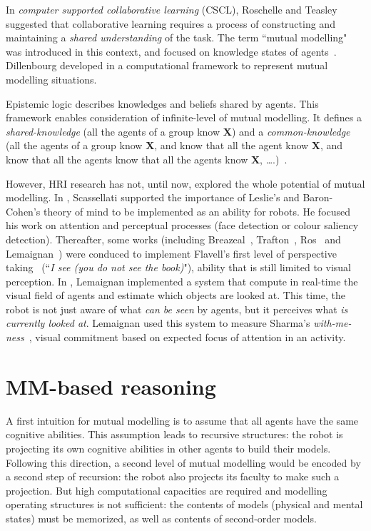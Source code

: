 \documentclass[conference]{IEEEtran}
\begin{document}
In \textit{computer supported collaborative learning} (CSCL), Roschelle and Teasley~\cite{roschelle1995construction} suggested that collaborative learning requires a process of constructing and maintaining a \textit{shared understanding} of the task. 
The term ``mutual modelling" was introduced in this context, and focused on knowledge states of agents~\cite{dillenbourg1999you}. Dillenbourg developed in \cite{sangin2007partner} a computational framework to represent mutual modelling situations.

Epistemic logic describes knowledges and beliefs shared by agents. This framework enables consideration of infinite-level of mutual modelling. It defines a \textit{shared-knowledge} (all the agents of a group know \textbf{X}) and a \textit{common-knowledge} (all the agents of a group know \textbf{X}, and know that all the agent know \textbf{X}, and know that all the agents know that all the agents know \textbf{X}, \dots.)~\cite{hendricks2008epistemic}. 

However, HRI research has not, until now, explored the whole potential of mutual modelling. In \cite{scassellati2002theory}, Scassellati supported the importance of Leslie's and Baron-Cohen's theory of mind to be implemented as an ability for robots. 
He focused his work on attention and perceptual processes (face detection or colour saliency detection). Thereafter, some works (including Breazeal~\cite{breazeal2006using}, Trafton~\cite{Trafton2005}, Ros~\cite{Ros2010} and Lemaignan~\cite{lemaignan2012thesis}) were conduced to implement Flavell's first level of perspective taking~\cite{flavell1977development} (``\textit{I see (you do not see the book)}"), ability that is still limited to visual perception. 
In \cite{lemaignan2016realtime}, Lemaignan implemented a system that compute in real-time the visual field of agents and estimate which objects are looked at. This time, the robot is not just aware of what \textit{can be seen} by agents, but it perceives what \textit{is currently looked at}. Lemaignan used this system to measure Sharma's \textit{with-me-ness}~\cite{sharma2014me}, visual commitment based on expected focus of attention in an activity. 

\section{MM-based reasoning}

A first intuition for mutual modelling is to assume that all agents have the same cognitive abilities. This assumption leads to recursive structures: the robot is projecting its own cognitive abilities in other agents to build their models.  Following this direction, a second level of mutual modelling would be encoded by a second step of recursion: the robot also projects its faculty to make such a projection. But high computational capacities are required and modelling operating structures is not sufficient: the contents of models (physical and mental states) must be memorized, as well as contents of second-order models. 
\end{document}

